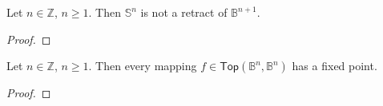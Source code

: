 \begin{lemma}
	Let $n \in \mathbb{Z}$, $n \geq 1$. Then $\mathbb{S}^n$ is not a retract of $\mathbb{B}^{n + 1}$. 	
\end{lemma}

\begin{proof}
	
\end{proof}

\begin{theorem}
	Let $n \in \mathbb{Z}$, $n \geq 1$. Then every mapping $f \in \mathsf{Top}(\mathbb{B}^n,\mathbb{B}^n)$ has a fixed point.	
	\label{thm:brouwer_fixed_point}
\end{theorem}

\begin{proof}
	
\end{proof}
